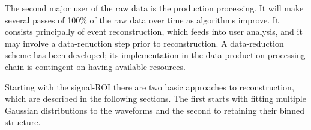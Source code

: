 The second major user of the raw data is the production processing.
It will make several passes of 100\% of the raw data over time as
algorithms improve.  It consists principally of 
event reconstruction, which feeds into user analysis, and 
it may involve a data-reduction step prior to reconstruction.
A data-reduction scheme has been developed; its implementation in the data production
processing chain is contingent on having available resources.


Starting with the signal-ROI there are two basic approaches to
reconstruction, which are described in the following
sections.  The first starts with fitting multiple Gaussian
distributions to the waveforms and the second to retaining their
binned structure.

